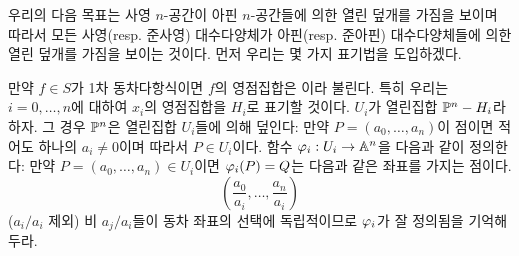 	
	\begin{definition}
	\end{definition}
	
	우리의 다음 목표는 사영 $n$-공간이 아핀 $n$-공간들에 의한 열린 덮개를 가짐을 보이며
	따라서 모든 사영(resp. 준사영) 대수다양체가 아핀(resp. 준아핀) 대수다양체들에 의한 열린 덮개를 가짐을 보이는 것이다.
	먼저 우리는 몇 가지 표기법을 도입하겠다.
	
	만약 $f\in S$가 1차 동차다항식이면 $f$의 영점집합은 이라 불린다.
	특히 우리는 $i=0,\ldots,n$에 대하여 $x_i$의 영점집합을 $H_i$로 표기할 것이다.
	$U_i$가 열린집합 $\mathbb{P}^n-H_i$라 하자. 그 경우 $\mathbb{P}^n$은 열린집합 $U_i$들에 의해 덮인다:
	만약 $P=(a_0,\ldots,a_n)$이 점이면 적어도 하나의 $a_i\ne 0$이며 따라서 $P\in U_i$이다.
	함수 $\varphi_i:U_i\rightarrow\mathbb{A}^n$을 다음과 같이 정의한다:
	만약 $P=(a_0,\ldots,a_n)\in U_i$이면 $\varphi_i(P)=Q$는 다음과 같은 좌표를 가지는 점이다.
	$$\left(\frac{a_0}{a_i},\ldots,\frac{a_n}{a_i}\right)$$
	($a_i/a_i$ 제외) 비 $a_j/a_i$들이 동차 좌표의 선택에 독립적이므로 $\varphi_i$가 잘 정의됨을 기억해 두라.
	
